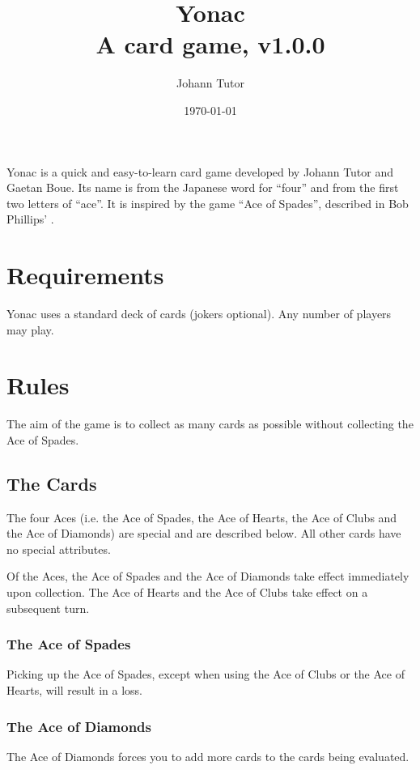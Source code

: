 \documentclass{article}
\newcommand\theversion{1.0.0}
\begin{document}
\title{Yonac\\ \large A card game, v\theversion}
\author{Johann Tutor}
\date{\today}
\maketitle

Yonac is a quick and easy-to-learn card game developed by Johann Tutor
and Gaetan Boue. Its name is from the Japanese word for ``four'' and
from the first two letters of ``ace''. It is inspired by the game ``Ace
of Spades'', described in Bob Phillips'
.

\tableofcontents

\newpage

\section{Requirements}

Yonac uses a standard deck of cards (jokers optional). Any number of
players may play.

\section{Rules}

The aim of the game is to collect as many cards as possible without
collecting the Ace of Spades.

\subsection{The Cards}
\label{sec:cards}

The four Aces (i.e. the Ace of Spades, the Ace of Hearts, the Ace of Clubs
and the Ace of Diamonds) are special and are described below. All other
cards have no special attributes.

Of the Aces, the Ace of Spades and the Ace of Diamonds take effect
immediately upon collection. The Ace of Hearts and the Ace of Clubs take
effect on a subsequent turn.

\subsubsection{The Ace of Spades}
Picking up the Ace of Spades, except when using the Ace of Clubs or the
Ace of Hearts, will result in a loss.

\subsubsection{The Ace of Diamonds}
The Ace of Diamonds forces you to add more cards to the cards being
evaluated.
\end{document}
